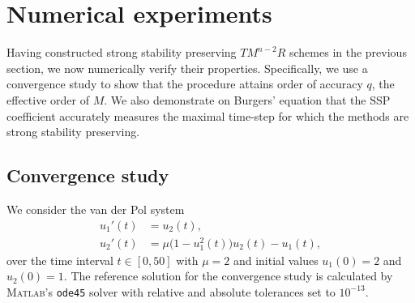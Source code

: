 \section{Numerical experiments}\label{sec:numerics}
Having constructed strong stability preserving $TM^{n-2}R$ schemes in the previous
section, we now numerically verify their properties.
Specifically, we use a convergence study to show that the procedure
attains order of accuracy $q$, the effective order of $M$.
We also demonstrate on Burgers' equation that the
SSP coefficient accurately measures the maximal time-step for which the
methods are strong stability preserving.

\subsection{Convergence study}\label{subsec:convergence}
We consider the van der Pol system \cite{Hairer1987_book}
\begin{equation}\label{eq:conv_eq}
	\begin{split}
    		u_1'(t) &= u_2(t), \\
                u_2'(t) &= \mu \bigl(1 - u_1^2(t)\bigr)u_2(t) - u_1(t),
    \end{split}
\end{equation}
over the time interval $t \in [0, 50]$ with $\mu = 2$ and initial
values $u_1(0) = 2$ and $u_2(0) = 1$.
The reference solution for the convergence study is calculated by \textsc{Matlab}'s 
\texttt{ode45} solver with relative and absolute tolerances set to $10^{-13}$.

